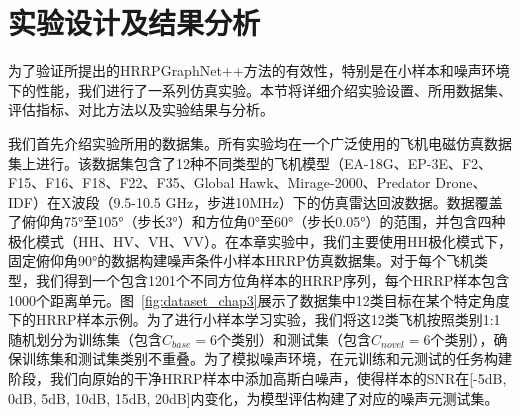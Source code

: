 \section{实验设计及结果分析}
\label{sec:noise_experiments}

为了验证所提出的HRRPGraphNet++方法的有效性，特别是在小样本和噪声环境下的性能，我们进行了一系列仿真实验。本节将详细介绍实验设置、所用数据集、评估指标、对比方法以及实验结果与分析。

我们首先介绍实验所用的数据集。所有实验均在一个广泛使用的飞机电磁仿真数据集上进行。该数据集包含了12种不同类型的飞机模型（EA-18G、EP-3E、F2、F15、F16、F18、F22、F35、Global Hawk、Mirage-2000、Predator Drone、IDF）在X波段（9.5-10.5 GHz，步进10MHz）下的仿真雷达回波数据。数据覆盖了俯仰角75°至105°（步长3°）和方位角0°至60°（步长0.05°）的范围，并包含四种极化模式（HH、HV、VH、VV）。在本章实验中，我们主要使用HH极化模式下，固定俯仰角90°的数据构建噪声条件小样本HRRP仿真数据集。对于每个飞机类型，我们得到一个包含1201个不同方位角样本的HRRP序列，每个HRRP样本包含1000个距离单元。图~\ref{fig:dataset_chap3}展示了数据集中12类目标在某个特定角度下的HRRP样本示例。为了进行小样本学习实验，我们将这12类飞机按照类别1:1随机划分为训练集（包含$C_{base}=6$个类别）和测试集（包含$C_{novel}=6$个类别），确保训练集和测试集类别不重叠。为了模拟噪声环境，在元训练和元测试的任务构建阶段，我们向原始的干净HRRP样本中添加高斯白噪声，使得样本的SNR在[-5dB, 0dB, 5dB, 10dB, 15dB, 20dB]内变化，为模型评估构建了对应的噪声元测试集。

